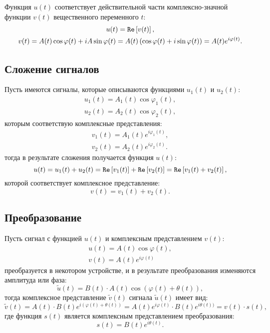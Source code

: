 Функция $u(t)$ соответствует действительной части комплексно-значной функции $v(t)$ вещественного переменного $t$:
\begin{gather*}
    u(t) = \mathtt{Re} \left [ v(t) \right ] , \\
    v(t)
    = A(t) \cos \varphi(t) + i A \sin \varphi(t)
    = A(t) \left ( \cos \varphi(t) + i \sin \varphi(t) \right )
    = A(t) e^{i \varphi(t)} .
\end{gather*}

\subsection{Сложение сигналов}

Пусть имеются сигналы, которые описываются функциями $u_1(t)$ и $u_2(t)$:
\begin{gather*}
    u_1(t) = A_1(t) \cos \varphi_1(t) , \\
    u_2(t) = A_2(t) \cos \varphi_2(t) ,
\end{gather*}
которым соответствую комплексные представления:
\begin{gather*}
    v_1(t) = A_1(t) e^{i \varphi_1(t)} , \\
    v_2(t) = A_2(t) e^{i \varphi_2(t)} .
\end{gather*}
тогда в результате сложения получается функция $u(t)$:
\[
    u(t)
    = u_1(t) + u_2(t)
    = \mathtt{Re} \left [ v_1(t) \right ] + \mathtt{Re} \left [ v_2(t) \right ]
    = \mathtt{Re} \left [ v_1(t) + v_2(t) \right ] ,
\]
которой соответствует комплексное представление:
\[
    v(t) = v_1(t) + v_2(t).
\]

\subsection{Преобразование}

Пусть сигнал с функцией $u(t)$ и комплексным представлением $v(t)$:
\begin{gather*}
    u(t) = A(t) \cos \varphi(t) , \\
    v(t) = A(t) e^{i \varphi(t)}
\end{gather*}
преобразуется в некотором устройстве, и в результате преобразования изменяются амплитуда или фаза:
\[
    \widetilde{u}(t) = B(t) \cdot A(t) \cos ( \varphi(t) + \theta(t) ) ,
\]
тогда комплексное представление $\widetilde{v}(t)$ сигнала $\widetilde{u}(t)$ имеет вид:
\[
    \widetilde{v}(t)
    = A(t) \cdot B(t) e^{i (\varphi(t) + \theta(t))}
    = A(t) e^{i \varphi(t)} \cdot B(t) e^{i \theta(t))} = v(t) \cdot s(t),
\]
где функция $s(t)$ является комплексным представлением преобразования:
\[
    s(t) = B(t) e^{i \theta(t)} .
\]

